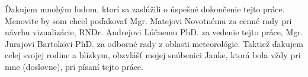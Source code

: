 \thispagestyle{empty}
\vspace*{\fill}
\hfill
\begin{minipage}{0.65\textwidth}
\vspace{0pt}\raggedright

Ďakujem mnohým ľudom, ktorí sa zaslúžili o úspešné dokončenie tejto práce. Menovite by som chcel poďakovať Mgr. Matejovi Novotnému za cenné rady pri návrhu vizualizácie, RNDr. Andrejovi Lúčnemu PhD. za vedenie tejto práce, Mgr. Jurajovi Bartokovi PhD. za odborné rady z oblasti meteorológie. Taktiež ďakujem celej svojej rodine a blízkym, obzvlášť mojej snúbenici Janke, ktorá bola vždy pri mne (doslovne), pri písaní tejto práce.

\end{minipage}
\vspace*{\fill}
\eject
